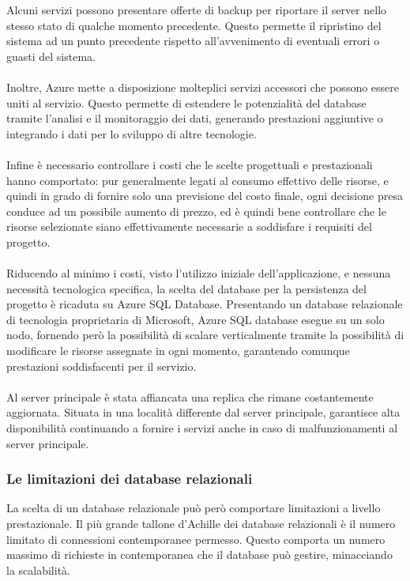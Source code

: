 Alcuni servizi possono presentare offerte di backup per riportare il server nello stesso stato di qualche momento precedente. 
Questo permette il ripristino del sistema ad un punto precedente rispetto all’avvenimento di eventuali errori o guasti del sistema.\\
\\

Inoltre, Azure mette a disposizione molteplici servizi accessori che possono essere uniti al servizio. 
Questo permette di estendere le potenzialità del database tramite  l’analisi e il monitoraggio dei dati, 
generando prestazioni aggiuntive o integrando i dati per lo sviluppo di altre tecnologie.\\
\\
Infine è necessario controllare i costi che le scelte progettuali e prestazionali hanno comportato: 
pur generalmente legati al consumo effettivo delle risorse, e quindi in grado di fornire solo una previsione del costo finale, 
ogni decisione presa conduce ad un possibile aumento di prezzo, 
ed è quindi bene controllare che le risorse selezionate siano effettivamente  necessarie a soddisfare i requisiti del progetto.\\
\\
Riducendo al minimo i costi, visto l’utilizzo iniziale dell’applicazione, e nessuna necessità tecnologica specifica, 
la scelta del database per la persistenza del progetto è ricaduta su Azure SQL Database. 
Presentando un database relazionale di tecnologia proprietaria di Microsoft, Azure SQL database esegue su un solo nodo, 
fornendo però la possibilità di  scalare  verticalmente tramite la possibilità di modificare le risorse assegnate in ogni momento, 
garantendo comunque prestazioni soddisfacenti per il servizio.\\
\\
Al server principale è stata affiancata una replica che rimane costantemente aggiornata. 
Situata in una località differente dal server principale, garantisce alta disponibilità continuando a fornire i servizi anche in caso di malfunzionamenti al server principale.
\clearpage
\subsubsection{ Le limitazioni dei database relazionali}

La scelta di un database relazionale può però comportare limitazioni a livello prestazionale. 
Il più grande tallone d'Achille dei database relazionali è il numero limitato di connessioni contemporanee permesso. 
Questo comporta un numero massimo di richieste in contemporanea che il database può gestire, minacciando la scalabilità. \\
\\

